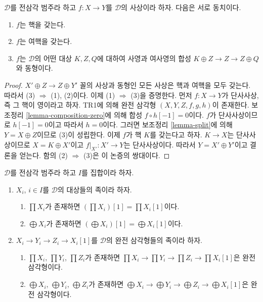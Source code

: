 \begin{lemma}
\label{lemma-when-split}
$\mathcal{D}$를 전삼각 범주라 하고 $f : X \to Y$를
$\mathcal{D}$의 사상이라 하자. 다음은 서로 동치이다.
\begin{enumerate}
\item $f$는 핵을 갖는다.
\item $f$는 여핵을 갖는다.
\item $f$는 $\mathcal{D}$의 어떤 대상 $K, Z, Q$에 대하여 사영과
여사영의 합성 $K \oplus Z \to Z \to Z \oplus Q$와 동형이다.
\end{enumerate}
\end{lemma}

\begin{proof}
$X' \oplus Z \to Z \oplus Y'$ 꼴의 사상과 동형인 모든 사상은 핵과
여핵을 모두 갖는다. 따라서 (3) $\Rightarrow$ (1), (2)이다.
이제 (1) $\Rightarrow$ (3)을 증명한다. 먼저 $f : X \to Y$가
단사사상, 즉 그 핵이 영이라고 하자. TR1에 의해 완전 삼각형
$(X, Y, Z, f, g, h)$이 존재한다. 보조정리
\ref{lemma-composition-zero}에 의해 합성 $f \circ h[-1] = 0$이다.
$f$가 단사사상이므로 $h[-1] = 0$이고 따라서 $h = 0$이다.
그러면 보조정리 \ref{lemma-split}에 의해 $Y = X \oplus Z$이므로
(3)이 성립한다. 이제 $f$가 핵 $K$를 갖는다고 하자.
$K \to X$는 단사사상이므로 $X = K \oplus X'$이고
$f|_{X'} : X' \to Y$는 단사사상이다. 따라서 $Y = X' \oplus Y'$이고
결론을 얻는다. 함의 (2) $\Rightarrow$ (3)은 이 논증의 쌍대이다.
\end{proof}

\begin{lemma}
\label{lemma-products-sums-shifts-triangles}
$\mathcal{D}$를 전삼각 범주라 하고 $I$를 집합이라 하자.
\begin{enumerate}
\item $X_i$, $i \in I$를 $\mathcal{D}$의 대상들의 족이라 하자.
\begin{enumerate}
\item $\prod X_i$가 존재하면 $(\prod X_i)[1] = \prod X_i[1]$이다.
\item $\bigoplus X_i$가 존재하면 $(\bigoplus X_i)[1] = \bigoplus X_i[1]$이다.
\end{enumerate}
\item $X_i \to Y_i \to Z_i \to X_i[1]$를 $\mathcal{D}$의
완전 삼각형들의 족이라 하자.
\begin{enumerate}
\item $\prod X_i$, $\prod Y_i$, $\prod Z_i$가 존재하면
$\prod X_i \to \prod Y_i \to \prod Z_i \to \prod X_i[1]$은
완전 삼각형이다.
\item $\bigoplus X_i$, $\bigoplus Y_i$, $\bigoplus Z_i$가 존재하면
$\bigoplus X_i \to \bigoplus Y_i \to \bigoplus Z_i \to \bigoplus X_i[1]$은
완전 삼각형이다.
\end{enumerate}
\end{enumerate}
\end{lemma}

